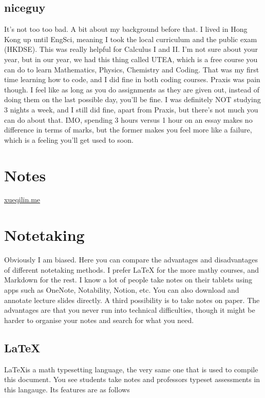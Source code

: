 \subsection{niceguy}

It's not too too bad. A bit about my background before that. I lived in Hong Kong up until EngSci, meaning I took the local curriculum and the public exam (HKDSE). This was really helpful for Calculus I and II. I'm not sure about your year, but in our year, we had this thing called UTEA, which is a free course you can do to learn Mathematics, Physics, Chemistry and Coding. That was my first time learning how to code, and I did fine in both coding courses. Praxis was pain though. I feel like as long as you do assignments as they are given out, instead of doing them on the last possible day, you'll be fine. I was definitely NOT studying 3 nights a week, and I still did fine, apart from Praxis, but there's not much you can do about that. IMO, spending 3 hours versus 1 hour on an essay makes no difference in terms of marks, but the former makes you feel more like a failure, which is a feeling you'll get used to soon.

\section{Notes}

\url{xueqilin.me}

\section{Notetaking}

Obviously I am biased. Here you can compare the advantages and disadvantages of different notetaking methods. I prefer LaTeX for the more mathy courses, and Markdown for the rest. I know a lot of people take notes on their tablets using apps such as OneNote, Notability, Notion, etc. You can also download and annotate lecture slides directly. A third possibility is to take notes on paper. The advantages are that you never run into technical difficulties, though it might be harder to organise your notes and search for what you need.

\subsection{LaTeX}

\LaTeX is a math typesetting language, the very same one that is used to compile this document. You see students take notes and professors typeset assessments in this langauge. Its features are as follows


